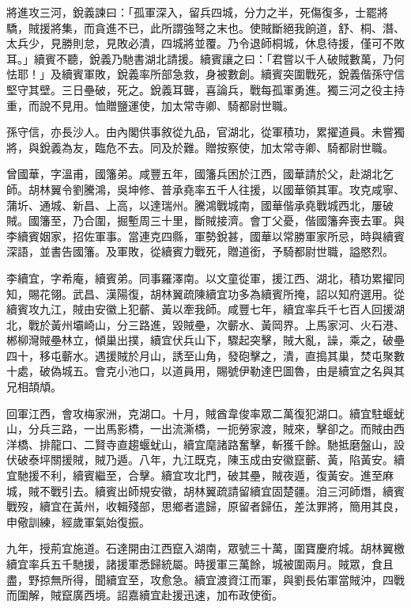 \begin{pinyinscope}
將進攻三河，銳義諫曰：「孤軍深入，留兵四城，分力之半，死傷復多，士罷將驕，賊援將集，而貪進不已，此所謂強弩之末也。使賊斷絕我餉道，舒、桐、潛、太兵少，見勝則怠，見敗必潰，四城將並覆。乃令退師桐城，休息待援，僅可不敗耳。」續賓不聽，銳義乃馳書湖北請援。續賓讓之曰：「君嘗以千人破賊數萬，乃何怯耶！」及續賓軍敗，銳義率所部急救，身被數創。續賓突圍戰死，銳義偕孫守信堅守其壁。三日壘破，死之。銳義耳聾，喜論兵，戰每孤軍勇進。獨三河之役主持重，而說不見用。恤贈鹽運使，加太常寺卿、騎都尉世職。

孫守信，亦長沙人。由內閣供事敘從九品，官湖北，從軍積功，累擢道員。未嘗獨將，與銳義為友，臨危不去。同及於難。贈按察使，加太常寺卿、騎都尉世職。

曾國華，字溫甫，國籓弟。咸豐五年，國籓兵困於江西，國華請於父，赴湖北乞師。胡林翼令劉騰鴻，吳坤修、普承堯率五千人往援，以國華領其軍。攻克咸寧、蒲圻、通城、新昌、上高，以達瑞州。騰鴻戰城南，國華偕承堯戰城西北，屢破賊。國籓至，乃合圍，掘塹周三十里，斷賊接濟。會丁父憂，偕國籓奔喪去軍。與李續賓姻家，招佐軍事。當連克四縣，軍勢銳甚，國華以常勝軍家所忌，時與續賓深語，並書告國籓。及軍敗，從續賓力戰死，贈道銜，予騎都尉世職，謚愍烈。

李續宜，字希庵，續賓弟。同事羅澤南。以文童從軍，援江西、湖北，積功累擢同知，賜花翎。武昌、漢陽復，胡林翼疏陳續宜功多為續賓所掩，詔以知府選用。從續賓攻九江，賊由安徽上犯蘄、黃以牽我師。咸豐七年，續宜率兵千七百人回援湖北，戰於黃州壩崎山，分三路進，毀賊壘，次蘄水、黃岡界。上馬家河、火石港、郴柳灣賊壘林立，傾巢出撲，續宜伏兵山下，驟起突擊，賊大亂，譟，乘之，破壘四十，移屯蘄水。遇援賊於月山，誘至山角，發砲擊之，潰，直搗其巢，焚屯聚數十處，破偽城五。會克小池口，以道員用，賜號伊勒達巴圖魯，由是續宜之名與其兄相頡頏。

回軍江西，會攻梅家洲，克湖口。十月，賊酋韋俊率眾二萬復犯湖口。續宜駐蝘蚘山，分兵三路，一出馬影橋，一出流澌橋，一扼勞家渡，賊來，擊卻之。而賊由西洋橋、排龍口、二賢寺直趨蝘蚘山，續宜麾諸路奮擊，斬獲千餘。馳抵磨盤山，設伏破泰坪關援賊，賊乃遁。八年，九江既克，陳玉成由安徽竄蘄、黃，陷黃安。續宜馳援不利，續賓繼至，合擊。續宜攻北門，破其壘，賊夜遁，復黃安。進至麻城，賊不戰引去。續賓出師規安徽，胡林翼疏請留續宜固楚疆。洎三河師熸，續賓戰歿，續宜在黃州，收輯殘部，思鄉者遣歸，原留者歸伍，差汰罪將，簡用其良，申儆訓練，經歲軍氣始復振。

九年，授荊宜施道。石達開由江西竄入湖南，眾號三十萬，圍寶慶府城。胡林翼檄續宜率兵五千馳援，諸援軍悉歸統屬。時援軍三萬餘，城被圍兩月。賊眾，食且盡，野掠無所得，聞續宜至，攻愈急。續宜渡資江而軍，與劉長佑軍當賊沖，四戰而圍解，賊竄廣西境。詔嘉續宜赴援迅速，加布政使銜。


\end{pinyinscope}
